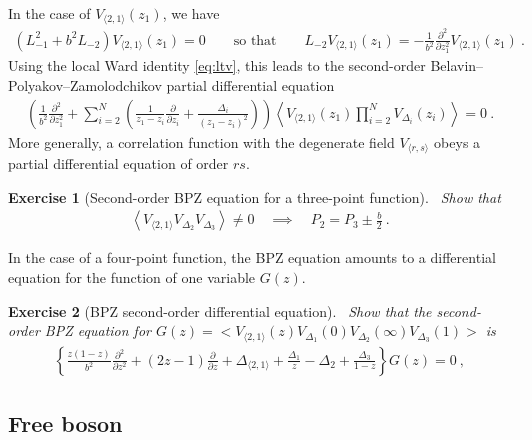 \documentclass[12pt, a4paper]{article}
\theoremstyle{break}
\newtheorem{exo}{Exercise}[section]
\begin{document}
In the case of $V_{\langle 2, 1 \rangle}(z_1)$, we have  
\begin{align}
\left(L_{-1}^2 + b^2 L_{-2}\right) V_{\langle 2, 1 \rangle}(z_1)  = 0\qquad \text{so that} \qquad L_{-2}V_{\langle 2, 1 \rangle}(z_1) = -\frac{1}{b^2}\frac{\partial^2}{\partial z_1^2} V_{\langle 2, 1 \rangle}(z_1)\ .
\end{align}
Using the local Ward identity \eqref{eq:ltv},
this leads to the second-order Belavin--Polyakov--Zamolodchikov partial differential equation
\begin{align}
 \left( \frac{1}{b^2}\frac{\partial^2}{\partial z_1^2} + \sum_{i=2}^N\left(\frac{1}{z_1-z_i}\frac{\partial}{\partial z_i} +\frac{\Delta_i}{(z_1-z_i)^2}\right) \right)\left< V_{\langle 2, 1 \rangle}(z_1) \prod_{i=2}^N V_{\Delta_i}(z_i) \right>  = 0\ .
 \label{eq:bpz}
\end{align}
More generally, a correlation function with the degenerate field $V_{\langle r,s\rangle}$ obeys a partial differential equation of order $rs$. 
\begin{tcolorbox}
\begin{exo}[Second-order BPZ equation for a three-point function]
 ~\label{exo:bpz3pt}
 Show that 
\begin{align}
 \left< V_{\langle 2, 1 \rangle} V_{\Delta_2} V_{\Delta_3} \right> \neq 0 \quad \implies \quad 
 P_2 = P_3 \pm \frac{b}{2}\ .
 \label{eq:alpm}
\end{align}
\end{exo}
\end{tcolorbox}
In the case of a four-point function, the BPZ equation amounts to a differential equation for the function of one variable $G(z)$.

\begin{exo}[BPZ second-order differential equation]
 ~\label{exo:bpz}
 Show that the second-order BPZ equation for $G(z)=\Big< V_{\langle 2, 1 \rangle}(z) V_{\Delta_1}(0)V_{\Delta_2}(\infty)V_{\Delta_3}(1) \Big>$ is
 \begin{align}
  \left\{ \frac{z(1-z)}{b^2}\frac{\partial^2}{\partial z^2} + (2z-1){\frac{\partial}{\partial z}} +\Delta_{\langle 2,1 \rangle} +\frac{\Delta_1}{z}-\Delta_2 + \frac{\Delta_3}{1-z}\right\} G(z)=0\ ,
\label{eq:ode}
 \end{align}
\end{exo}

\subsection{Free boson}\label{sec:fb}
\end{document}
